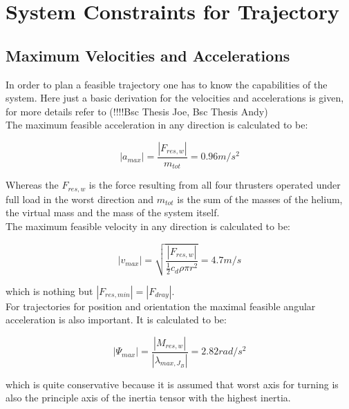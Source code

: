 \section{System Constraints for Trajectory}

\subsection{Maximum Velocities and Accelerations}
In order to plan a feasible trajectory one has to know the capabilities of the system. Here just a basic derivation for the velocities and accelerations is given, for more details refer to (!!!!Bsc Thesis Joe, Bsc Thesis Andy)\\

The maximum feasible acceleration in any direction is calculated to be:

\begin{equation}
  \left|a_{max} \right| =  \frac{\left|F_{res, w}\right|}{m_{tot}} = 0.96 m/s^2
\end{equation}

Whereas the $F_{res,w}$ is the force resulting from all four thrusters operated under full load in the worst direction and $m_{tot}$ is the sum of the masses of the helium, the virtual mass and the mass of the system itself.\\


The maximum feasible velocity in any direction is calculated to be:

\begin{equation}
\left|v_{max} \right| = \sqrt{\frac{\left|F_{res,w} \right|}{\frac{1}{2}c_d \rho \pi r^2}}=4.7 m/s
\end{equation}

which is nothing but $ \left|F_{res,min} \right| = \left|F_{dray} \right| $.\\

For trajectories for position and orientation the maximal feasible angular acceleration is also important. It is calculated to be:

\begin{equation}
  \left|\Psi_{max} \right| =  \frac{\left|M_{res,w}\right|}{\left| \lambda_{max, J_{B}} \right|} = 2.82 rad/s^2 
\end{equation}

which is quite conservative because it is assumed that worst axis for turning is also the principle axis of the inertia tensor with the highest inertia.\\

